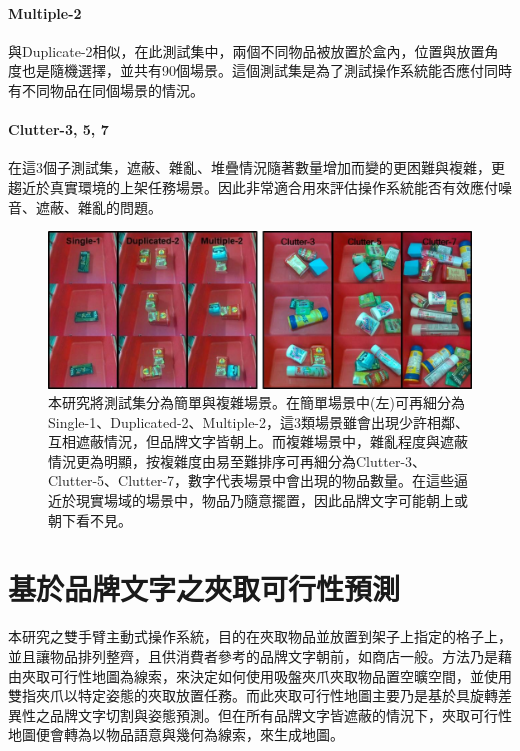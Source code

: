 \paragraph{Multiple-2}
與Duplicate-2相似，在此測試集中，兩個不同物品被放置於盒內，位置與放置角度也是隨機選擇，並共有90個場景。這個測試集是為了測試操作系統能否應付同時有不同物品在同個場景的情況。

\paragraph{Clutter-3, 5, 7}
在這3個子測試集，遮蔽、雜亂、堆疊情況隨著數量增加而變的更困難與複雜，更趨近於真實環境的上架任務場景。因此非常適合用來評估操作系統能否有效應付噪音、遮蔽、雜亂的問題。


\begin{figure}[H]
	\centering
	\includegraphics[height=!, width=1.0\linewidth, keepaspectratio=true]
	{./figures/testset.jpg}
  \caption{本研究將測試集分為簡單與複雜場景。在簡單場景中(左)可再細分為Single-1、Duplicated-2、Multiple-2，這3類場景雖會出現少許相鄰、互相遮蔽情況，但品牌文字皆朝上。而複雜場景中，雜亂程度與遮蔽情況更為明顯，按複雜度由易至難排序可再細分為Clutter-3、Clutter-5、Clutter-7，數字代表場景中會出現的物品數量。在這些逼近於現實場域的場景中，物品乃隨意擺置，因此品牌文字可能朝上或朝下看不見。}
  \label{figure:testset}
\end{figure}


\section{基於品牌文字之夾取可行性預測}
本研究之雙手臂主動式操作系統，目的在夾取物品並放置到架子上指定的格子上，並且讓物品排列整齊，且供消費者參考的品牌文字朝前，如商店一般。方法乃是藉由夾取可行性地圖為線索，來決定如何使用吸盤夾爪夾取物品置空曠空間，並使用雙指夾爪以特定姿態的夾取放置任務。而此夾取可行性地圖主要乃是基於具旋轉差異性之品牌文字切割與姿態預測。但在所有品牌文字皆遮蔽的情況下，夾取可行性地圖便會轉為以物品語意與幾何為線索，來生成地圖。

